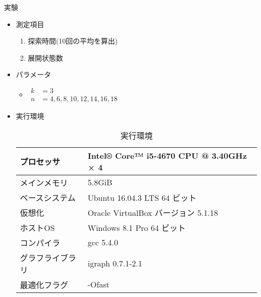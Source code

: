 \begin{frame}{実験}
  \begin{itemize}
  \item 測定項目
    \begin{enumerate}
    \item 探索時間(10回の平均を算出)
    \item 展開状態数
    \end{enumerate}
  \item パラメータ
    \begin{itemize}
    \item[]\par$\begin{aligned}
      k &= 3 \\
      n &= 4,6,8,10,12,14,16,18
    \end{aligned}$
    \end{itemize}
  \item 実行環境
    \par\begin{table}
    \scriptsize
    \caption{実行環境}
    \label{tab:env-lab}
    \centering
    \begin{tabular}{ll}
      \hline
      プロセッサ & Intel® Core™ i5-4670 CPU @ 3.40GHz × 4 \\ \hline
      メインメモリ & 5.8GiB \\ \hline
      ベースシステム & Ubuntu 16.04.3 LTS 64 ビット \\ \hline
      仮想化 & Oracle VirtualBox バージョン 5.1.18 \\ \hline
      ホストOS & Windows 8.1 Pro 64 ビット \\ \hline
      コンパイラ & gcc 5.4.0 \\ \hline
      グラフライブラリ & igraph 0.7.1-2.1 \\ \hline
      最適化フラグ & -Ofast \\ \hline
    \end{tabular}
    \end{table}
  \end{itemize}
\end{frame}


